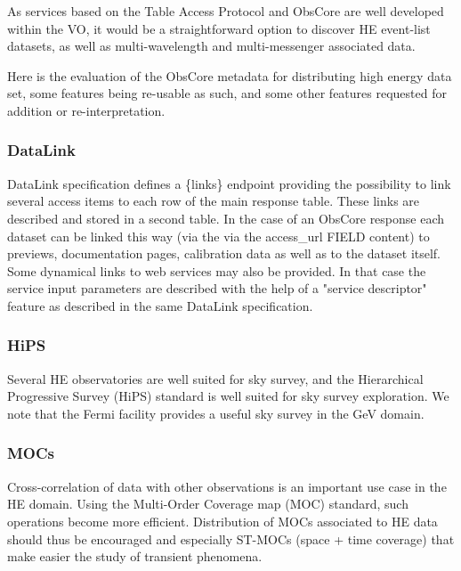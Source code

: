 \documentclass[11pt,a4paper]{ivoa}
\begin{document}
As services based on the Table Access Protocol \citep{2019ivoa.spec.0927D} and ObsCore are well developed within the VO, it would be a straightforward option to discover HE event-list datasets, as well as multi-wavelength and multi-messenger associated data.

Here is the evaluation of the ObsCore metadata for distributing high energy data set, some features being re-usable as such, and some other features requested for addition or re-interpretation.


\subsubsection{DataLink}


DataLink specification \citep{2023ivoa.spec.1215B} defines a \{links\} endpoint providing the possibility to link several
access items to each row of the main response table. These links are described and stored in a second
table. In the case of an ObsCore response each dataset can be linked this way (via the via the access\_url
FIELD content) to previews, documentation pages, calibration data as well as to the dataset itself.
Some dynamical links to web services may also be provided. In that case the service input parameters are
described with the help of a "service descriptor" feature as described in the same DataLink specification.

\subsubsection{HiPS}

Several HE observatories are well suited for sky survey, and the Hierarchical Progressive Survey (HiPS) standard is well suited for sky survey exploration. We note that the Fermi facility provides a useful sky survey in the GeV domain.


\subsubsection{MOCs}

Cross-correlation of data with other observations is an important use case in the HE domain. Using the Multi-Order Coverage map (MOC) standard, such operations become more efficient. Distribution of MOCs associated to HE data should thus be encouraged and especially ST-MOCs (space + time coverage)
that make easier the study of transient phenomena.
\end{document}
